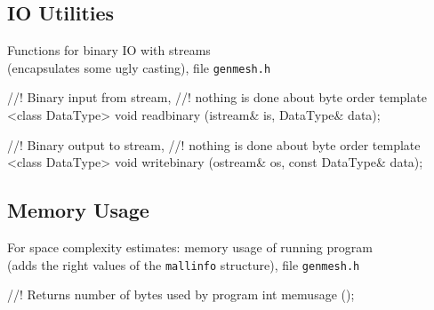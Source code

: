 \subsection {IO Utilities}

Functions for binary IO with streams\\
(encapsulates some ugly casting), file \lstinline$genmesh.h$

\begin{myverbatim}
//! Binary input from stream,
//! nothing is done about byte order
template <class DataType>
  void readbinary (istream& is, DataType& data);

//! Binary output to stream,
//! nothing is done about byte order
template <class DataType>
  void writebinary (ostream& os, const DataType& data);
\end{myverbatim}

\subsection {Memory Usage}

For space complexity estimates: memory usage of running program\\
(adds the right values of the \lstinline$mallinfo$ structure), file \lstinline$genmesh.h$

\begin{myverbatim}
//! Returns number of bytes used by program
int memusage ();
\end{myverbatim}

